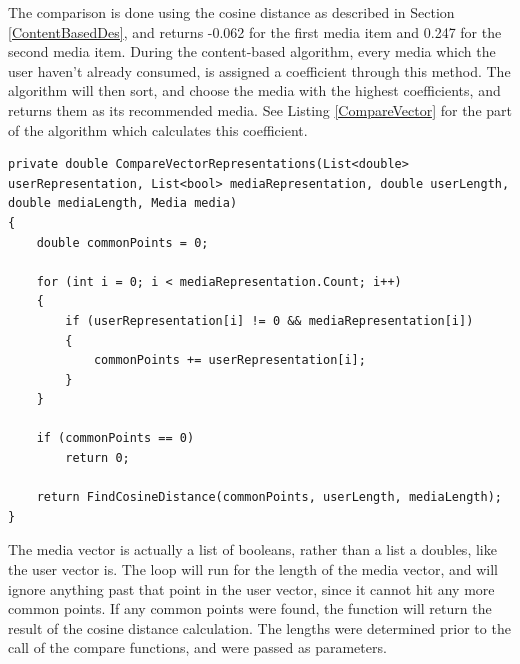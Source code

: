 The comparison is done using the cosine distance as described in Section \ref{ContentBasedDes}, and returns -0.062 for the first media item and 0.247 for the second media item. During the content-based algorithm, every media which the user haven’t already consumed, is assigned a coefficient through this method. The algorithm will then sort, and choose the media with the highest coefficients, and returns them as its recommended media. See Listing \ref{CompareVector} for the part of the algorithm which calculates this coefficient.

\begin{lstlisting}[caption={The CompareVectorRepresentations method},label={CompareVector}]
private double CompareVectorRepresentations(List<double> userRepresentation, List<bool> mediaRepresentation, double userLength, double mediaLength, Media media)
{
	double commonPoints = 0;

	for (int i = 0; i < mediaRepresentation.Count; i++)
	{
		if (userRepresentation[i] != 0 && mediaRepresentation[i])
		{
			commonPoints += userRepresentation[i];
		}
	}

	if (commonPoints == 0)
		return 0;

	return FindCosineDistance(commonPoints, userLength, mediaLength);
}
\end{lstlisting}

The media vector is actually a list of booleans, rather than a list a doubles, like the user vector is. The loop will run for the length of the media vector, and will ignore anything past that point in the user vector, since it cannot hit any more common points. If any common points were found, the function will return the result of the cosine distance calculation. The lengths were determined prior to the call of the compare functions, and were passed as parameters.